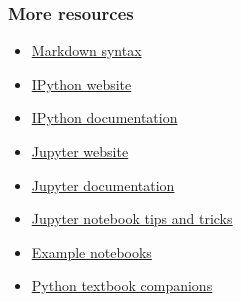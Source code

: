 \documentclass[14pt,compress]{beamer}
\begin{document}
\begin{frame}[fragile]
  \frametitle{More resources}
  \begin{itemize}
  \item \href{https://daringfireball.net/projects/markdown/syntax}{Markdown syntax}
  \item \href{http://ipython.org}{IPython website}
  \item \href{http://ipython.org/documentation.html}{IPython documentation}
  \item \href{http://jupyter.org}{Jupyter website}
  \item \href{https://jupyter.readthedocs.io/en/latest/index.html}{Jupyter documentation}
  \item
    \href{https://www.dataquest.io/blog/jupyter-notebook-tips-tricks-shortcuts/}{Jupyter
    notebook tips and tricks}
  \item \href{https://nbviewer.jupyter.org}{Example notebooks}
  \item \href{http://tbc-python.fossee.in}{Python textbook companions}
  \end{itemize}
\end{frame}
\end{document}
